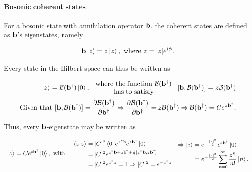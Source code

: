 \documentclass{homework}
\begin{document}
\paragraph{\textbf{Bosonic coherent states}}

For a bosonic state with annihilation operator ${\bf b}$, the coherent states are defined as ${\bf b}$'s eigenstates, namely 

$$
    {\bf b} \ket{z} = z \ket{z}, \textnormal{ where } z = |z| e^{i\phi}.
$$

Every state in the Hilbert space can thus be written as 

\begin{align*}
    \ket{z} = \mathcal{B}({\bf b}^\dagger) \ket{0}, \begin{array}{c}
     \textnormal{ where the function $\mathcal{B}({\bf b}^\dagger)$ }\\
     \textnormal{  has to satisfy }
\end{array} [{\bf b},  \mathcal{B}({\bf b}^\dagger)] = z \mathcal{B}({\bf b}^\dagger) \\
\textnormal{Given that } [{\bf b}, \mathcal{B}({\bf b}^\dagger)] = \frac{\partial \mathcal{B}({\bf b}^\dagger)}{\partial {\bf b}^\dagger} \Rightarrow \frac{\partial \mathcal{B}({\bf b}^\dagger)}{\partial {\bf b}^\dagger}  = z \mathcal{B}({\bf b}^\dagger) \Rightarrow \mathcal{B}({\bf b}^\dagger) = C e^{z {\bf b}^\dagger}.
\end{align*}

Thus, every ${\bf b}$-eigenstate may be written as

\begin{equation*}   
\begin{array}{ccc}
     \ket{z} = C e^{z {\bf b}^\dagger} \ket{0}, \textnormal{ with } & 
     \begin{split}
     \bra{z}\ket{z} &= |C|^2 \bra{0} e^{z^* {\bf b}} e^{z {\bf b}^\dagger} \ket{0} \\
     &= |C|^2 e^{z^* {\bf b} + z {\bf b}^\dagger + \frac{1}{2} [z^* {\bf b}, z {\bf b}^\dagger]} \\
     &= |C|^2 e^{z^*z} = 1 \Rightarrow |C|^2 = e^{-z^*z} 
     \end{split} 
     &  \begin{split} \Rightarrow \ket{z} &= e^{-\frac{|z|^2}{2}} e^{z {\bf b}^\dagger} \ket{0}  \\
         &= e^{-\frac{|z|^2}{2}} \sum_{n=0}^{\infty} \frac{z^n}{n!} \ket{n}.
     \end{split}
     \end{array}
\end{equation*}
\end{document}
